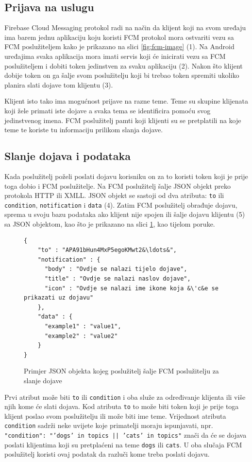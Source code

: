 \documentclass[times, utf8, zavrsni]{fer}
\begin{document}
\subsection{Prijava na uslugu}
Firebase Cloud Messaging protokol radi na način da klijent koji na svom uređaju ima barem jednu aplikaciju koju koristi FCM protokol mora ostvariti vezu sa FCM poslužiteljem kako je prikazano na slici \ref{fig:fcm-image} (1). Na Android uređajima svaka aplikacija mora imati servis koji će inicirati vezu sa FCM poslužiteljem i dobiti token jedinstven za svaku aplikaciju (2). Nakon što klijent dobije token on ga šalje svom poslužitelju koji bi trebao token spremiti ukoliko planira slati dojave tom klijentu (3). 

Klijent isto tako ima mogućnost prijave na razne teme. Teme su skupine klijenata koji žele primati iste dojave a svaka tema se identificira pomoću svog jedinstvenog imena. FCM poslužitelj pamti koji klijenti su se pretplatili na koje teme te koriste tu informaciju prilikom slanja dojave.

\subsection{Slanje dojava i podataka}
Kada poslužitelj poželi poslati dojavu korisniku on za to koristi token koji je prije toga dobio i FCM poslužitelje. Na FCM poslužitelj šalje JSON objekt preko protokola HTTP ili XMLL. JSON objekt se sastoji od dva atributa: {\tt to}  ili {\tt condition}, {\tt notification} i {\tt data} (4). Zatim FCM poslužitelj obrađuje dojavu, sprema u svoju bazu podataka ako klijent nije spojen ili šalje dojavu klijentu (5) sa JSON objektom, kao što je prikazano na slici \ref{lst:json-dojava}, kao tijelom poruke.

\begin{figure}
\begin{lstlisting}
{
    "to" : "APA91bHun4MxP5egoKMwt2&\ldots&",
    "notification" : {
      "body" : "Ovdje se nalazi tijelo dojave",
      "title" : "Ovdje se nalazi naslov dojave",
      "icon" : "Ovdje se nalazi ime ikone koja &\'c&e se prikazati uz dojavu"
    },
    "data" : {
      "example1" : "value1",
      "example2" : "value2"
    }
}
\end{lstlisting}
\caption{Primjer JSON objekta kojeg poslužitelj šalje FCM poslužitelju za slanje dojave}
\label{lst:json-dojava}
\end{figure}

Prvi atribut može biti {\tt to} ili {\tt condition} i oba služe za određivanje klijenta ili više njih kome će slati dojava. Kod atributa {\tt to} to može biti token koji je prije toga klijent poslao svom poslužitelju ili može biti ime teme. Vrijednost atributa {\tt condition} sadrži neke uvijete koje primatelji moraju ispunjavati, npr. {\tt "condition": "'dogs' in topics || 'cats' in topics"} znači da će se dojava poslati klijentima koji su pretplaćeni na teme {\tt dogs}  ili {\tt cats}. U oba slučaja FCM poslužitelj koristi ovaj podatak da razluči kome treba poslati dojavu.
\end{document}
